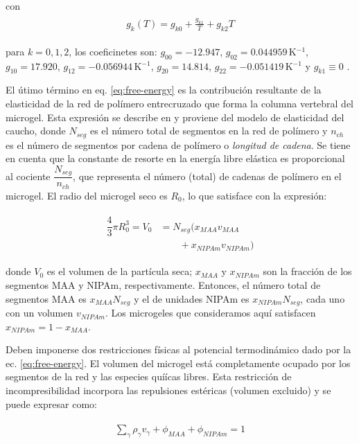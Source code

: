 \noindent con
%
%
\begin{align}
\begin{aligned} 
g_k(T)=g_{k0} + \frac{g_{k1}}{T} + g_{k2}T
\end{aligned}
\end{align}


\noindent para  $k=0,1,2$, los coeficinetes son: $g_{00}= -12.947$, $g_{02}=0.044959\,$K$^{-1}$, $g_{10}= 17.920$, $g_{12}= -0.056944$\,K$^{-1}$, $g_{20}= 14.814$, $g_{22}= -0.051419$\,K$^{-1}$  y $g_{k1}\equiv 0$ \addcite[afroze2000]. 


El \'utimo t\'ermino en eq. \ref{eq:free-energy} es la contribuci\'on resultante de la elasticidad de la red de pol\'imero entrecruzado que forma la columna vertebral del microgel.
Esta expresi\'on se describe en  y proviene del modelo de elasticidad del caucho,
donde $N_{seg}$ es el n\'umero total de segmentos en la red de pol\'imero y $n_{ch}$ es el n\'umero de segmentos por cadena de pol\'imero o \emph{longitud de cadena}.
Se tiene en cuenta que la constante de resorte en la energ\'ia libre el\'astica es proporcional al cociente $\dfrac{N_{seg}}{n_{ch}}$, que representa el n\'umero (total) de cadenas de pol\'imero en el microgel.
El radio del microgel seco es $R_0$, lo que satisface con la expresi\'on:

%
%
\begin{align}
\begin{aligned} 
\dfrac{4}{3}\pi R_0^3=V_0&=N_{seg}\Big( x_{MAA} v_{MAA}\\
&\qquad+x_{NIPAm} v_{NIPAm}\Big)
\end{aligned}
\end{align}


\noindent donde $V_0$ es el volumen de la part\'icula seca; $x_{MAA}$ y $x_{NIPAm}$ son la fracci\'on de los segmentos MAA y NIPAm, respectivamente.
Entonces, el n\'umero total de segmentos MAA es $x_{MAA}N_{seg}$ y el de unidades NIPAm es $x_{NIPAm}N_{seg}$, cada uno con un volumen $v_{NIPAm}$.
Los microgeles que consideramos aqu\'i satisfacen $x_{NIPAm}=1-x_{MAA}$.


Deben imponerse dos restricciones f\'isicas al potencial termodin\'amico dado por la ec. \ref{eq:free-energy}.
El volumen del microgel est\'a completamente ocupado por los segmentos de la red y las especies quí\'icas libres.
Esta restricci\'on de incompresibilidad incorpora las repulsiones est\'ericas (volumen excluido) y se puede expresar como:
%

%
%
\begin{align}
\begin{aligned}
\sum_{\gamma } \rho_\gamma v_\gamma  + \phi_{MAA} + \phi_{NIPAm} = 1
\end{aligned}
\label{eq:packing}
\end{align}



